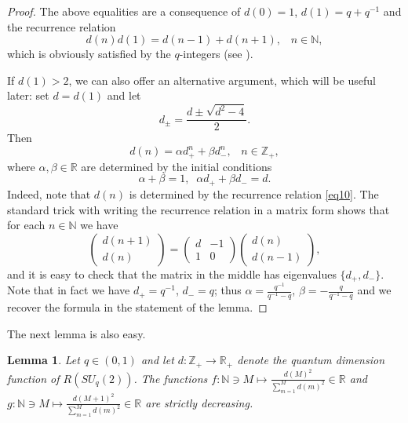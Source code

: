 \documentclass[11 pt, leqno]{amsart}
\newcommand{\NN}{\mathbb{N}}
\newcommand{\RR}{\mathbb{R}}
\newcommand{\ZZ}{\mathbb{Z}}
\newtheorem{lemma}[theorem]{Lemma}
\theoremstyle{definition}
\numberwithin{equation}{section}
\begin{document}
\begin{proof}
	The above equalities are a consequence of $d(0)=1$, $d(1) = q+q^{-1}$ and the recurrence relation
	\begin{equation}\label{eq10}
	d (n) d(1) = d(n-1) + d(n+1), \;\;\; n \in \NN, 
	\end{equation}
	which is obviously satisfied by the $q$-integers (see \cite[Formula(7)]{Kachurik}). 
	
	If $d(1)>2$, we can also offer an alternative argument, which will be useful later: set $d=d(1)$ and let
	\[ d_{\pm} = \frac{d \pm \sqrt{d^2-4}}{2}. \label{alphabeta}\]
	Then 
	\[ d(n) = \alpha d_+^n + \beta d_{-}^n, \;\;\; n \in \ZZ_+,\]
	where $\alpha, \beta \in \mathbb{R}$ are determined by the initial conditions
	\[ \alpha+ \beta =1, \;\;\alpha d_+ + \beta d_- = d.\]
	Indeed, note that $d(n)$ is determined by the recurrence relation \eqref{eq10}. The standard trick with writing the recurrence relation in a matrix form shows that for each $n \in \NN$ we have 
	\[ \begin{pmatrix}  d(n+1)\\ d(n) \end{pmatrix} =  \begin{pmatrix}  d & -1\\ 1 & 0 \end{pmatrix} \begin{pmatrix}  d(n)\\ d(n-1) \end{pmatrix},\]
	and it is easy to check that the matrix in the middle has eigenvalues $\{d_+, d_-\}$.  Note that in fact we have $d_+ = q^{-1}$, $d_- =q$; thus 
	$\alpha = \frac{q^{-1}}{q^{-1} -q} $, $\beta = - \frac{q}{q^{-1} -q}$ and we recover the formula in the statement of the lemma.

	
	
	
	
\end{proof}


The next lemma is also easy.

\begin{lemma}\label{lemma7}
	Let $q \in (0,1)$ and let $d\colon  \ZZ_+\to \RR_+$ denote the quantum dimension function of $R(SU_q(2))$. The functions $f\colon \NN\ni M\mapsto \tfrac{ d(M)^2}{\sum_{m=1}^{M} d(m)^2 } \in \RR$ and 
	$g\colon \NN\ni M\mapsto \tfrac{ d(M+1)^2}{\sum_{m=1}^{M} d(m)^2 } \in \RR$ are strictly decreasing.
\end{lemma}
\end{document}
